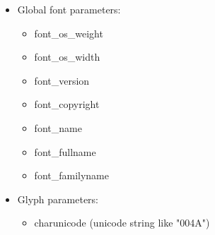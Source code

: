 \documentclass{scrartcl}
\begin{document}
\begin{itemize}
	\item Global font parameters:
	\begin{itemize}
		\item font\_os\_weight
		\item font\_os\_width
		\item font\_version
		\item font\_copyright
		\item font\_name
		\item font\_fullname
		\item font\_familyname
	\end{itemize}
	\item Glyph parameters:
	\begin{itemize}
		\item charunicode (unicode string like "004A")
	\end{itemize}
\end{itemize}
%
\end{document}
